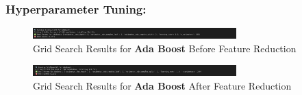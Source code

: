 \documentclass[a4paper,12pt]{article}
\begin{document}
\subsubsection{Hyperparameter Tuning:}
\begin{figure}[H]
    \centering
    \includegraphics[width=0.7\textwidth]{./images/gsada1.png}
    \caption{Grid Search Results for \textbf{Ada Boost} Before Feature Reduction}
    \label{fig:fig_19}
\end{figure}
\begin{figure}[H]
    \centering
    \includegraphics[width=0.7\textwidth]{./images/gsada2.png}
    \caption{Grid Search Results for \textbf{Ada Boost} After Feature Reduction}
    \label{fig:fig_20}
\end{figure}
\end{document}
